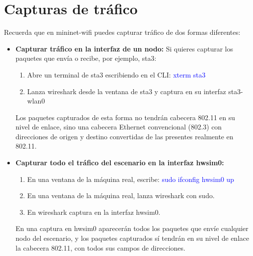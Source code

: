 \documentclass[12pt, a4paper]{report}
\begin{document}
\section*{Capturas de tráfico}
Recuerda que en mininet-wifi puedes capturar tráfico de dos formas diferentes:
\begin{itemize}
	\item\textbf{ Capturar tráfico en la interfaz de un nodo:} Si quieres capturar los paquetes que envía o
	recibe, por ejemplo, sta3:
	\begin{enumerate}
		\item Abre un terminal de sta3 escribiendo en el CLI: \textcolor{blue}{xterm sta3}
		\item Lanza wireshark desde la ventana de sta3 y captura en su interfaz sta3-wlan0 
	\end{enumerate}
	Los paquetes capturados de esta forma no tendrán cabecera 802.11 en su nivel de enlace, sino
	una cabecera Ethernet convencional (802.3) con direcciones de origen y destino convertidas de
	las presentes realmente en 802.11.
	\item \textbf{Capturar todo el tráfico del escenario en la interfaz hwsim0:}
	\begin{enumerate}
		\item En una ventana de la máquina real, escribe: \textcolor{blue}{sudo ifconfig hwsim0 up}
		\item En una ventana de la máquina real, lanza wireshark con sudo.
		\item En wireshark captura en la interfaz hwsim0.
	\end{enumerate}
	En una captura en hwsim0 aparecerán todos los paquetes que envíe cualquier nodo del escenario,
	y los paquetes capturados sí tendrán en su nivel de enlace la cabecera 802.11, con todos sus campos
	de direcciones.
\end{itemize}
\end{document}
